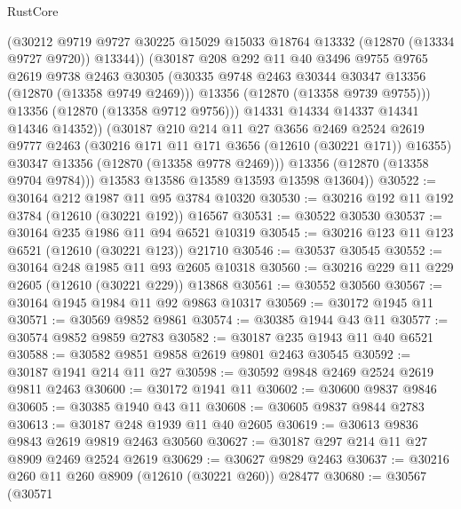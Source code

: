 \begin{lexlean}{RustCore}
\begin{coremodule}
                  (@30212
                    @9719
                    @9727
                    @30225
                    @15029
                    @15033
                    @18764
                    @13332
                    (@12870 (@13334 @9727 @9720))
                    @13344))
                (@30187
                  @208
                  @292
                  @11
                  @40
                  @3496
                  @9755
                  @9765
                  @2619
                  @9738
                  @2463
                  @30305
                  (@30335 @9748 @2463 @30344 @30347 @13356 (@12870 (@13358 @9749 @2469)))
                  @13356
                  (@12870 (@13358 @9739 @9755)))
                @13356
                (@12870 (@13358 @9712 @9756)))
              @14331
              @14334
              @14337
              @14341
              @14346
              @14352))
          (@30187
            @210
            @214
            @11
            @27
            @3656
            @2469
            @2524
            @2619
            @9777
            @2463
            (@30216 @171 @11 @171 @3656 (@12610 (@30221 @171)) @16355)
            @30347
            @13356
            (@12870 (@13358 @9778 @2469)))
          @13356
          (@12870 (@13358 @9704 @9784)))
        @13583
        @13586
        @13589
        @13593
        @13598
        @13604))
@30522 := @30164 @212 @1987 @11 @95 @3784 @10320
@30530 := @30216 @192 @11 @192 @3784 (@12610 (@30221 @192)) @16567
@30531 := @30522 @30530
@30537 := @30164 @235 @1986 @11 @94 @6521 @10319
@30545 := @30216 @123 @11 @123 @6521 (@12610 (@30221 @123)) @21710
@30546 := @30537 @30545
@30552 := @30164 @248 @1985 @11 @93 @2605 @10318
@30560 := @30216 @229 @11 @229 @2605 (@12610 (@30221 @229)) @13868
@30561 := @30552 @30560
@30567 := @30164 @1945 @1984 @11 @92 @9863 @10317
@30569 := @30172 @1945 @11
@30571 := @30569 @9852 @9861
@30574 := @30385 @1944 @43 @11
@30577 := @30574 @9852 @9859 @2783
@30582 := @30187 @235 @1943 @11 @40 @6521
@30588 := @30582 @9851 @9858 @2619 @9801 @2463 @30545
@30592 := @30187 @1941 @214 @11 @27
@30598 := @30592 @9848 @2469 @2524 @2619 @9811 @2463
@30600 := @30172 @1941 @11
@30602 := @30600 @9837 @9846
@30605 := @30385 @1940 @43 @11
@30608 := @30605 @9837 @9844 @2783
@30613 := @30187 @248 @1939 @11 @40 @2605
@30619 := @30613 @9836 @9843 @2619 @9819 @2463 @30560
@30627 := @30187 @297 @214 @11 @27 @8909 @2469 @2524 @2619
@30629 := @30627 @9829 @2463
@30637 := @30216 @260 @11 @260 @8909 (@12610 (@30221 @260)) @28477
@30680 := @30567
    (@30571

\end{coremodule}
\end{lexlean}
